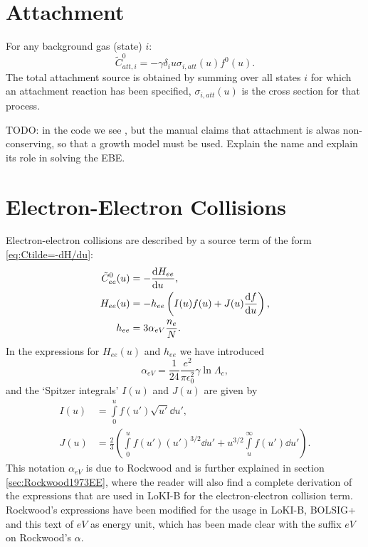 \documentclass{book}
\begin{document}
\section{Attachment}
For any background gas (state) $i$:
\begin{equation}
	\tilde{C}^0_{att,i}=-\gamma \delta_i u\sigma_{i,att}(u)f^0(u).
	\label{eq:Ctilde0-att}
\end{equation}
The total attachment source is obtained by summing over all states $i$ for
which an attachment reaction has been specified, $\sigma_{i,att}(u)$ is the
cross section for that process.

TODO: in the code we see , but the manual
\cite[below eq. 16]{Manual_2_2_0} claims that attachment is alwas non-conserving,
so that a growth model must be used. Explain the name 
and explain its role in solving the EBE.

\section{Electron-Electron Collisions}
\label{sec:ee-operator}

Electron-electron collisions are described by a source term of the form
\eqref{eq:Ctilde=-dH/du}:
\begin{align}
	\tilde{C}^0_{ee}(u) &= -\DERIV{H_{ee}}{u},
	\label{eq:Ctilde0-ee} \\
	H_{ee}(u) &= -h_{ee}\left(I(u)f(u) + J(u)\DERIV{f}{u}\right),
	\label{eq:H_ee} \\
	h_{ee} &= 3\alpha_{eV}\frac{n_e}{N}.
	\label{eq:x_ee}
\end{align}
In the expressions for $H_{ee}(u)$ and $h_{ee}$ we have introduced
\begin{equation}
	\alpha_{eV} = \frac{1}{24}\frac{e^2}{\pi\epsilon_0^2}\gamma\ln\Lambda_c,
	\label{eq:alpha_eV}
\end{equation}
and the `Spitzer integrals' $I(u)$ and $J(u)$ are given by \cite[eqns. 59--62]{Ferreira2000}
\begin{align}
	I(u) &= \int\limits_0^u f(u')\sqrt{u'}\dd{u'}, \label{eq:I} \\
	J(u) &= \frac{2}{3}\left(
		\int\limits_0^u f(u')(u')^{3/2}\dd{u'}
		+
		u^{3/2}\int\limits_u^\infty f(u')\dd{u'}
		\right). \label{eq:J}
\end{align}
This notation $\alpha_{eV}$ is due to Rockwood \cite[below equation B1]{Rockwood1973} and is further explained
in section \ref{sec:Rockwood1973EE}, where the reader will also find a complete derivation of the
expressions that are used in LoKI-B for the electron-electron collision term. Rockwood's expressions
have been modified for the usage in LoKI-B, BOLSIG+ and this text of $\si{eV}$ as energy unit,
which has been made clear with the suffix $\si{eV}$ on Rockwood's $\alpha$.
\end{document}
